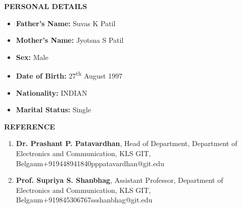 \documentclass[a4paper]{article}
\begin{document}

	\begin{flushleft}
		\vspace{5mm}
		\large{\textbf{PERSONAL DETAILS }} 
		\vspace{0.5mm}
		\noindent\hrulefill
		\vspace{0.5mm}
	\end{flushleft}
	\begin{itemize}
		\item \textbf{Father's Name:} Suvas K Patil
		\item \textbf{Mother's Name:} Jyotsna S Patil
		\item \textbf{Sex:} Male
		\item \textbf{Date of Birth:} 27\textsuperscript{th} August 1997
		\item \textbf{Nationality:} INDIAN
		\item \textbf{Marital Status:} Single 				          
	\end{itemize}

	\begin{flushleft}
		\vspace{5mm}
		\large{\textbf{REFERENCE}} 
		\vspace{0.5mm}
		\noindent\hrulefill
		\vspace{0.5mm}
	\end{flushleft}
	\begin{enumerate}
		\item   \textbf{Dr. Prashant P. Patavardhan}, Head of Department, Department of Electronics and Communication, KLS GIT, Belgaum\textbar +919448941840\textbar pppatavardhan@git.edu
		\item   \textbf{Prof. Supriya S. Shanbhag}, Assistant Professor, Department of Electronics and Communication, KLS GIT, Belgaum\textbar+919845306767\textbar ssshanbhag@git.edu     
	\end{enumerate}
\end{document}
